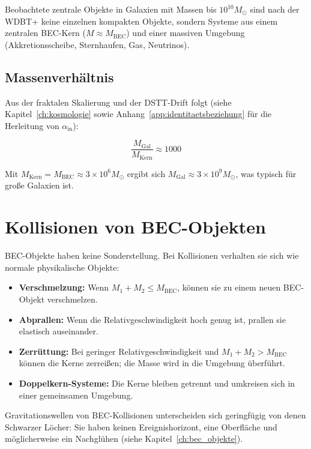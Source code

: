 Beobachtete zentrale Objekte in Galaxien mit Massen bis \( 10^{10} M_{\odot} \) sind nach der WDBT+ keine einzelnen kompakten Objekte, sondern Systeme aus einem zentralen BEC-Kern (\( M \approx M_{\text{BEC}} \)) und einer massiven Umgebung (Akkretionsscheibe, Sternhaufen, Gas, Neutrinos).

\subsection{Massenverhältnis}
\label{sub:bec_massenverhaeltnis}

Aus der fraktalen Skalierung und der DSTT-Drift folgt (siehe Kapitel~\ref{ch:kosmologie} sowie Anhang~\ref{app:identitaetsbeziehung} für die Herleitung von \( \alpha_{\text{in}} \)):

\[
\frac{M_{\text{Gal}}}{M_{\text{Kern}}} \approx 1000 \tag{K.24}
\]

Mit \( M_{\text{Kern}} = M_{\text{BEC}} \approx 3 \times 10^6 M_{\odot} \) ergibt sich \( M_{\text{Gal}} \approx 3 \times 10^9 M_{\odot} \), was typisch für große Galaxien ist.

\section{Kollisionen von BEC-Objekten}
\label{app:bec_kollisionen}

BEC-Objekte haben keine Sonderstellung. Bei Kollisionen verhalten sie sich wie normale physikalische Objekte:

\begin{itemize}
    \item \textbf{Verschmelzung:} Wenn \( M_1 + M_2 \leq M_{\text{BEC}} \), können sie zu einem neuen BEC-Objekt verschmelzen.
    \item \textbf{Abprallen:} Wenn die Relativgeschwindigkeit hoch genug ist, prallen sie elastisch auseinander.
    \item \textbf{Zerrüttung:} Bei geringer Relativgeschwindigkeit und \( M_1 + M_2 > M_{\text{BEC}} \) können die Kerne zerreißen; die Masse wird in die Umgebung überführt.
    \item \textbf{Doppelkern-Systeme:} Die Kerne bleiben getrennt und umkreisen sich in einer gemeinsamen Umgebung.
\end{itemize}

Gravitationswellen von BEC-Kollisionen unterscheiden sich geringfügig von denen Schwarzer Löcher: Sie haben keinen Ereignishorizont, eine Oberfläche und möglicherweise ein Nachglühen (siehe Kapitel~\ref{ch:bec_objekte}).


